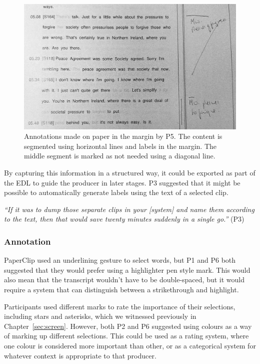 \begin{figure}[h]
  \centering
  \includegraphics[width=\columnwidth]{figs/print/pen-annotations-p5-cropped-bw.jpg}
  \caption{Annotations made on paper in the margin by P5. The content is segmented using horizontal lines and labels in
  the margin.  The middle segment is marked as not needed using a diagonal line.}
  \label{fig:p5-annotations}
\end{figure}



By capturing this information in a structured way, it could be exported as part of the EDL to guide the producer in
later stages.  P3 suggested that it might be possible to automatically generate labels using the text of a selected
clip.

\textit{``If it was to dump those separate clips in your [system] and name them according to the text, then that would
save twenty minutes suddenly in a single go.''} (P3)


\subsubsection{Annotation}




PaperClip used an underlining gesture to select words, but P1 and P6 both suggested that they would prefer using a
highlighter pen style mark.  This would also mean that the transcript wouldn't have to be double-spaced, but it would
require a system that can distinguish between a strikethrough and highlight.


Participants used different marks to rate the importance of their selections, including stars and asterisks, which we
witnessed previously in Chapter~\ref{sec:screen}. However, both P2 and P6 suggested using colours as a way of marking
up different selections.  This could be used as a rating system, where one colour is considered more important than
other, or as a categorical system for whatever context is appropriate to that producer.

